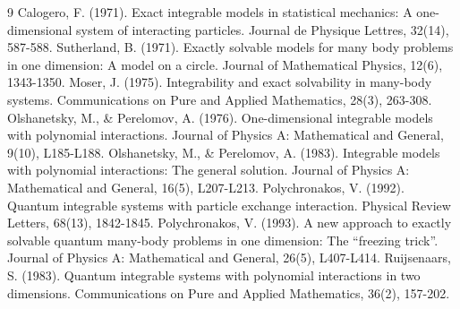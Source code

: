 \documentclass[12pt]{article}
\begin{document}
\begin{thebibliography}{9}
     Calogero, F. (1971). Exact integrable models in statistical mechanics: A one-dimensional system of interacting particles. Journal de Physique Lettres, 32(14), 587-588.
     Sutherland, B. (1971). Exactly solvable models for many body problems in one dimension: A model on a circle. Journal of Mathematical Physics, 12(6), 1343-1350.
     Moser, J. (1975). Integrability and exact solvability in many-body systems. Communications on Pure and Applied Mathematics, 28(3), 263-308.
     Olshanetsky, M., & Perelomov, A. (1976). One-dimensional integrable models with polynomial interactions. Journal of Physics A: Mathematical and General, 9(10), L185-L188.
     Olshanetsky, M., & Perelomov, A. (1983). Integrable models with polynomial interactions: The general solution. Journal of Physics A: Mathematical and General, 16(5), L207-L213.
     Polychronakos, V. (1992). Quantum integrable systems with particle exchange interaction. Physical Review Letters, 68(13), 1842-1845.
     Polychronakos, V. (1993). A new approach to exactly solvable quantum many-body problems in one dimension: The “freezing trick”. Journal of Physics A: Mathematical and General, 26(5), L407-L414.
     Ruijsenaars, S. (1983). Quantum integrable systems with polynomial interactions in two dimensions. Communications on Pure and Applied Mathematics, 36(2), 157-202.
\end{thebibliography}
\end{document}
